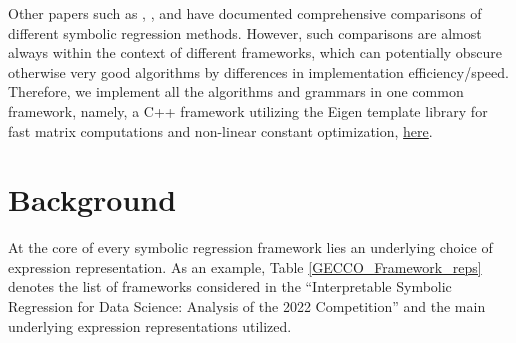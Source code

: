 \documentclass[12pt]{iopart}
\begin{document}
\par Other papers such as \cite{lacava2021contemporary}, \cite{10.1145/3205455.3205539}, and \cite{Zegklitz2021} have documented comprehensive comparisons of different symbolic regression methods. However, such comparisons are almost always within the context of different frameworks, which can potentially obscure otherwise very good algorithms by differences in implementation efficiency/speed. Therefore, we implement all the algorithms and grammars in one common framework, namely, a C++ framework utilizing the Eigen template library  \cite{eigenweb} for fast matrix computations and non-linear constant optimization, \href{https://github.com/edfink234/Alpha-Zero-Symbolic-Regression/tree/prefix_and_postfix_cpp_implementation}{here}.

 

\section{Background}\label{sec:Background}

At the core of every symbolic regression framework lies an underlying choice of expression representation.
As an example, Table \ref {GECCO_Framework_reps} denotes the list of frameworks considered in the ``Interpretable Symbolic Regression for Data Science: Analysis of the 2022 Competition'' \cite{defranca2023interpretable} and the main underlying expression representations utilized. 
\end{document}
